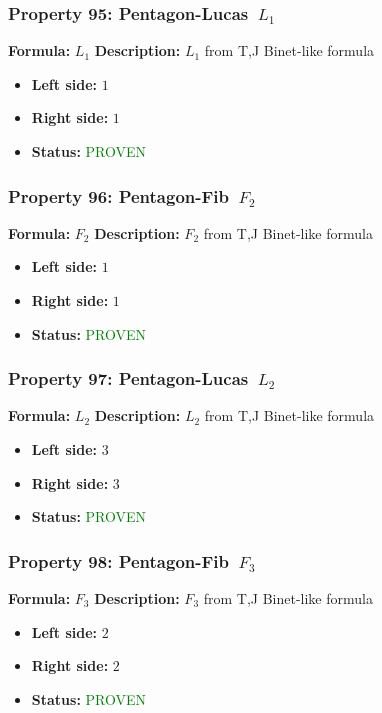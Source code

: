 \subsubsection*{Property 95: Pentagon-Lucas~$L_{1}$}
\textbf{Formula:} $L_1$
\textbf{Description:} $L_{1}$ from T,J Binet-like formula

\begin{itemize}
\item \textbf{Left side:} $1$
\item \textbf{Right side:} $1$
\item \textbf{Status:} \textcolor{green}{PROVEN}
\end{itemize}

\subsubsection*{Property 96: Pentagon-Fib~$F_{2}$}
\textbf{Formula:} $F_2$
\textbf{Description:} $F_{2}$ from T,J Binet-like formula

\begin{itemize}
\item \textbf{Left side:} $1$
\item \textbf{Right side:} $1$
\item \textbf{Status:} \textcolor{green}{PROVEN}
\end{itemize}

\subsubsection*{Property 97: Pentagon-Lucas~$L_{2}$}
\textbf{Formula:} $L_2$
\textbf{Description:} $L_{2}$ from T,J Binet-like formula

\begin{itemize}
\item \textbf{Left side:} $3$
\item \textbf{Right side:} $3$
\item \textbf{Status:} \textcolor{green}{PROVEN}
\end{itemize}

\subsubsection*{Property 98: Pentagon-Fib~$F_{3}$}
\textbf{Formula:} $F_3$
\textbf{Description:} $F_{3}$ from T,J Binet-like formula

\begin{itemize}
\item \textbf{Left side:} $2$
\item \textbf{Right side:} $2$
\item \textbf{Status:} \textcolor{green}{PROVEN}
\end{itemize}

